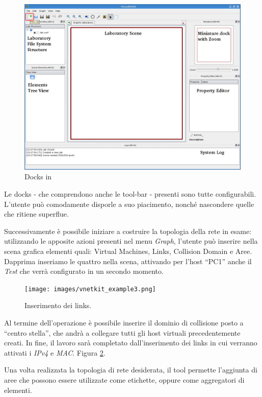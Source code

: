 \begin{figure}[!htb]
	\centering
	\includegraphics[width=12.5cm]{images/vnetkit_example1.png}
	\caption{Docks in \visualnetkit{}}
	\label{figura:vn_ex_dock}
\end{figure}

Le docks - che comprendono anche le tool-bar - presenti sono tutte configurabili. L'utente può comodamente disporle a suo piacimento, nonché nascondere quelle che ritiene superflue.

Successivamente è possibile iniziare a costruire la topologia della rete in esame: utilizzando le apposite azioni presenti nel menu \emph{Graph}, l'utente può inserire nella scena grafica elementi quali: Virtual Machines, Links, Collision Domain e Aree. Dapprima inseriamo le quattro \virtualmachine{} nella scena, attivando per l'host ``PC1'' anche il \plugin{} \emph{Test} che verrà configurato in un secondo momento.

\begin{figure}[!htb]
	\centering
	\texttt{[image: images/vnetkit\_example3.png]}
	\caption{Inserimento dei links.}
	\label{figura:vn_ex_links}
\end{figure}

Al termine dell'operazione è possibile inserire il dominio di collisione posto a ``centro stella'', che andrà a collegare tutti gli host virtuali precedentemente creati. In fine, il lavoro sarà completato dall'inserimento dei links in cui verranno attivati i \plugin{} \emph{IPv4} e \emph{MAC}. Figura \ref{figura:vn_ex_links}.

Una volta realizzata la topologia di rete desiderata, il tool permette l'aggiunta di aree che possono essere utilizzate come etichette, oppure come aggregatori di elementi.

